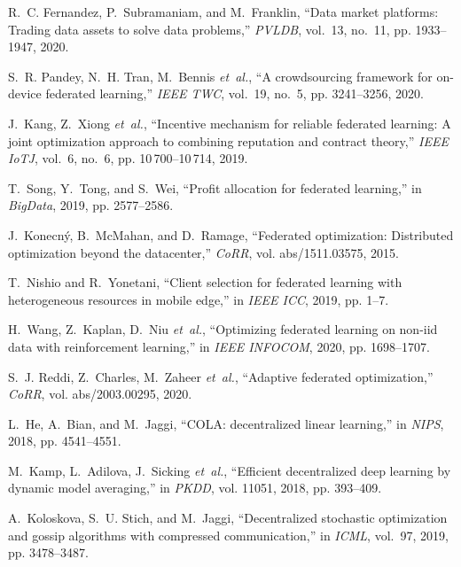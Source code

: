 \documentclass[11pt]{article}
\begin{document}
\begin{thebibliography}{10}
\begin{small}
		R.~C. Fernandez, P.~Subramaniam, and M.~Franklin, ``Data market platforms:
		Trading data assets to solve data problems,'' \emph{PVLDB}, vol.~13, no.~11,
		pp. 1933--1947, 2020.
		
		S.~R. Pandey, N.~H. Tran, M.~Bennis \emph{et~al.}, ``A crowdsourcing framework
		for on-device federated learning,'' \emph{{IEEE} TWC}, vol.~19, no.~5, pp.
		3241--3256, 2020.
		
		J.~Kang, Z.~Xiong \emph{et~al.}, ``Incentive mechanism for reliable federated
		learning: {A} joint optimization approach to combining reputation and
		contract theory,'' \emph{{IEEE} IoTJ}, vol.~6, no.~6, pp. 10\,700--10\,714,
		2019.
		
		T.~Song, Y.~Tong, and S.~Wei, ``Profit allocation for federated learning,'' in
		\emph{BigData}, 2019, pp. 2577--2586.
		
		J.~Konecn{\'{y}}, B.~McMahan, and D.~Ramage, ``Federated optimization:
		Distributed optimization beyond the datacenter,'' \emph{CoRR}, vol.
		abs/1511.03575, 2015.
		
		T.~Nishio and R.~Yonetani, ``Client selection for federated learning with
		heterogeneous resources in mobile edge,'' in \emph{IEEE ICC}, 2019, pp. 1--7.
		
		H.~Wang, Z.~Kaplan, D.~Niu \emph{et~al.}, ``Optimizing federated learning on
		non-iid data with reinforcement learning,'' in \emph{IEEE INFOCOM}, 2020, pp.
		1698--1707.
		
		S.~J. Reddi, Z.~Charles, M.~Zaheer \emph{et~al.}, ``Adaptive federated
		optimization,'' \emph{CoRR}, vol. abs/2003.00295, 2020.
		
		L.~He, A.~Bian, and M.~Jaggi, ``{COLA:} decentralized linear learning,'' in
		\emph{NIPS}, 2018, pp. 4541--4551.
		
		M.~Kamp, L.~Adilova, J.~Sicking \emph{et~al.}, ``Efficient decentralized deep
		learning by dynamic model averaging,'' in \emph{PKDD}, vol. 11051, 2018, pp.
		393--409.
		
		A.~Koloskova, S.~U. Stich, and M.~Jaggi, ``Decentralized stochastic
		optimization and gossip algorithms with compressed communication,'' in
		\emph{ICML}, vol.~97, 2019, pp. 3478--3487.
		

\end{small}
\end{thebibliography}
\end{document}
